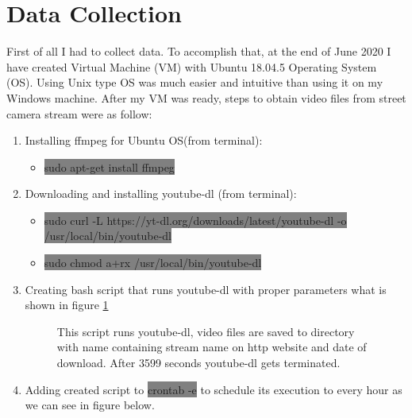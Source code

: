 \section{Data Collection}
\label{sec:collection}
First of all I had to collect data. To accomplish that, at the end of June 2020 I have created Virtual Machine (VM) with Ubuntu 18.04.5 Operating System (OS). Using Unix type OS was much easier and intuitive than using it on my Windows machine. After my VM was ready, steps to obtain video files from street camera stream were as follow:
\begin{enumerate}
    \item Installing ffmpeg for Ubuntu OS(from terminal):
    \begin{itemize}
        \item \colorbox{Gray}{sudo apt-get install ffmpeg}
    \end{itemize}
    \item Downloading and installing youtube-dl (from terminal):
    \begin{itemize}
        \item \colorbox{Gray}{sudo curl -L https://yt-dl.org/downloads/latest/youtube-dl -o /usr/local/bin/youtube-dl}
        \item \colorbox{Gray}{sudo chmod a+rx /usr/local/bin/youtube-dl}
    \end{itemize}
    \item Creating bash script that runs youtube-dl with proper parameters what is shown in figure \ref{fig:script}
    \begin{figure}[H]
        \centering
        \caption{This script runs youtube-dl, video files are saved to  directory with name containing stream name on http website and date of download. After 3599 seconds youtube-dl gets terminated.}
        \label{fig:script}
    \end{figure}
    \item Adding created script to \colorbox{Gray}{crontab -e} to schedule its execution to every hour as we can see in figure below.
    \begin{figure}[H]
        \centering

\end{figure}
\end{enumerate}
